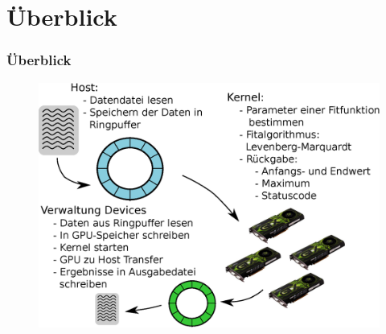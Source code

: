 \documentclass[ddcfooter]{tudbeamer}
\begin{document}
\section{Überblick}
\begin{frame}
    \frametitle*{Überblick}
    \begin{figure}
        \centering
        \includegraphics[scale=.35]{Architektur.eps}
    \end{figure}
\end{frame}
\end{document}
